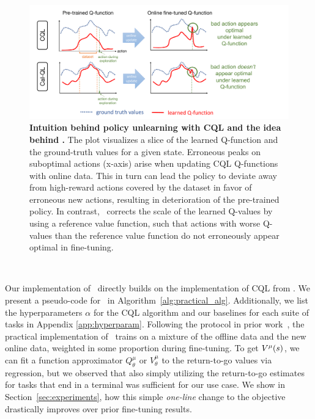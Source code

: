 \begin{figure}
\centering
\vspace{-0.2cm}
\includegraphics[trim={0 0 2.7cm 0},clip,width=0.98\linewidth]{chapters/cal_ql/figs-sample/figure_for_calql_final.pdf}
\vspace{-0.2cm}
\caption{
\footnotesize{\textbf{Intuition behind policy unlearning with CQL and the idea behind \methodname.} The plot visualizes a slice of the learned Q-function and the ground-truth values for a given state. Erroneous peaks on suboptimal actions (x-axis) arise when updating CQL Q-functions with online data. This in turn can lead the policy to deviate away from high-reward actions covered by the dataset in favor of erroneous new actions, resulting in deterioration of the pre-trained policy. In contrast, \methodname\ corrects the scale of the learned Q-values by using a reference value function, such that actions with worse Q-values than the reference value function do not erroneously appear optimal in fine-tuning.}}
\label{fig:calql_idea}
\vspace{-0.4cm}
\end{figure}

~

 Our implementation of \methodname\ directly builds on the implementation of CQL from \citet{geng2022jaxcql}. We present a pseudo-code for \methodname\ in Algorithm~\ref{alg:practical_alg}. Additionally, we list the hyperparameters $\alpha$ for the CQL algorithm and our baselines for each suite of tasks in Appendix \ref{app:hyperparam}. Following the protocol in prior work~\citep{kostrikov2021offlineb,song2023hybrid}, the practical implementation of \methodname\ trains on a mixture of the offline data and the new online data, weighted in some proportion during fine-tuning. To get $V^\mu(s)$, we can fit a function approximator $Q^\mu_\theta$ or $V^\mu_\theta$ to the return-to-go values via regression, but we observed that also simply utilizing the return-to-go estimates for tasks that end in a terminal was sufficient for our use case. We show in  Section~\ref{sec:experiments}, how this simple \emph{one-line} change to the objective drastically improves over prior fine-tuning results.

\vspace{-0.2cm}